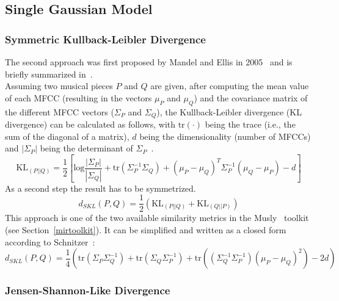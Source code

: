 \subsection{Single Gaussian Model}

\subsubsection{Symmetric Kullback-Leibler Divergence}\label{klth}

The second approach was first proposed by Mandel and Ellis in 2005~\cite{mandelellis1} and is briefly summarized in~\cite[pp. 65f]{knees1}.\\
Assuming two musical pieces $P$ and $Q$ are given, after computing the mean value of each MFCC (resulting in the vectors $\mu_P$ and $\mu_Q$) and the covariance matrix of the different MFCC vectors ($\Sigma_P$ and $\Sigma_Q$), the Kullback-Leibler divergence (KL divergence) can be calculated as follows, with $\text{tr}(\cdot)$ being the trace (i.e., the sum of the diagonal of a matrix), $d$ being the dimensionality (number of MFCCs) and $|\Sigma_P|$ being the determinant of $\Sigma_P$~\cite[pp. 65f]{knees1}.\\
\begin{equation} \label{eq:KL1}
\text{KL}_{(P||Q)} = \frac{1}{2}[\text{log}\frac{|\Sigma_P|}{|\Sigma_Q|} + \text{tr}(\Sigma_P^{-1}\Sigma_Q) + (\mu_P - \mu_Q)^T \Sigma_P^{-1} (\mu_Q - \mu_P) - d]
\end{equation}
As a second step the result has to be symmetrized.
\begin{equation} \label{eq:KL2}
d_{SKL}(P, Q) = \frac{1}{2} (\text{KL}_{(P||Q)} + \text{KL}_{(Q||P)}) 
\end{equation}
This approach is one of the two available similarity metrics in the Musly~\cite{musly1} toolkit (see Section~\ref{mirtoolkit}). It can be simplified and written as a closed form according to Schnitzer~\cite[p. 44]{schnitzer1}:
\begin{equation} \label{eq:SKL}
d_{SKL}(P, Q) = \frac{1}{4} (\text{tr}(\Sigma_P\Sigma_Q^{-1}) + \text{tr}(\Sigma_Q\Sigma_P^{-1}) + \text{tr}((\Sigma_Q^{-1}\Sigma_P^{-1})(\mu_P - \mu_Q)^2) - 2d)
\end{equation}

\subsubsection{Jensen-Shannon-Like Divergence}

